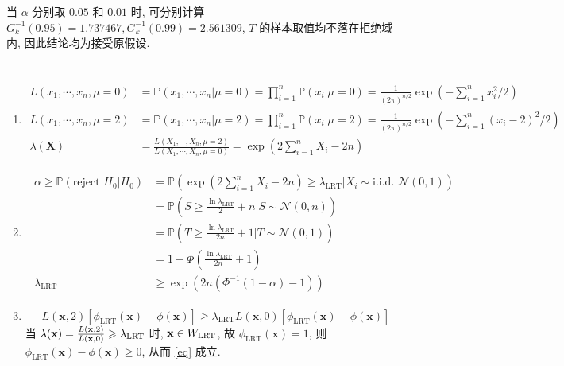 \documentclass[8pt]{article}
\theoremstyle{compact}
\def\ge{\geqslant}
\def\P#1{\mathbb{P}\left({#1}\right)}
\begin{document}
当 $\alpha$ 分别取 $0.05$ 和 $0.01$ 时, 可分别计算 $G_k^{-1}(0.95) = 1.737467, G_k^{-1}(0.99) = 2.561309$, $T$ 的样本取值均不落在拒绝域内, 因此结论均为接受原假设.

\section{}
\def\LRT{\text{LRT}}
\begin{enumerate}
	\item \begin{align*}
		L(x_1, \cdots, x_n, \mu = 0) &= \P{x_1, \cdots, x_n | \mu = 0} = \prod_{i=1}^{n}\P{x_i | \mu = 0} = \frac{1}{(2\pi)^{n/2}}\exp\left(-\sum_{i=1}^{n}x_i^2 / 2\right) \\
		L(x_1, \cdots, x_n, \mu = 2) &= \P{x_1, \cdots, x_n | \mu = 2} = \prod_{i=1}^{n}\P{x_i | \mu = 2} = \frac{1}{(2\pi)^{n/2}}\exp\left(-\sum_{i=1}^{n}(x_i - 2)^2 / 2\right) \\
		\lambda(\mathbf X) &= \frac{L(X_1, \cdots, X_n, \mu = 2)}{L(X_1, \cdots, X_n, \mu = 0)} = \exp\left(2\sum_{i=1}^{n}X_i - 2n\right)
	\end{align*}
	\item  \begin{align*}
		\begin{split}
			\alpha \ge \P{\text{reject }H_0 | H_0} &= \P{\exp\left(2\sum_{i=1}^{n}X_i - 2n\right) \ge \lambda_{\LRT} \bigg| X_i \sim \text{i.i.d. }\mathcal N(0, 1)} \\
			&= \P{S \ge \frac{\ln \lambda_{\LRT}}{2} + n \bigg| S \sim \mathcal N(0, n)} \\
			&= \P{T \ge \frac{\ln \lambda_{\LRT}}{2n} + 1 \bigg| T \sim \mathcal N(0, 1)} \\
			&= 1 - \Phi\left(\frac{\ln \lambda_{\LRT}}{2n} + 1\right) \\ \lambda_{\LRT} &\ge \exp\left(2n(\Phi^{-1}(1 - \alpha) - 1)\right)
		\end{split}
	\end{align*}
	\item \begin{equation}
		L(\mathbf x, 2)[\phi_{\LRT}(\mathbf x) - \phi(\mathbf x)] \ge \lambda_{\LRT}L(\mathbf x, 0)[\phi_{\LRT}(\mathbf x) - \phi(\mathbf x)]
		\label{eq}
	\end{equation}
	当 $\lambda(\textbf x) = \frac{L(\mathbf x, 2)}{L(\mathbf x, 0)} \ge \lambda_{\LRT}$ 时, $\textbf x \in W_{\LRT}$, 故 $\phi_{\LRT}(\mathbf x) = 1$, 则 $\phi_{\LRT}(\mathbf x) - \phi(\mathbf x) \ge 0$, 从而 \cref{eq} 成立.
	

\end{enumerate}
\end{document}
